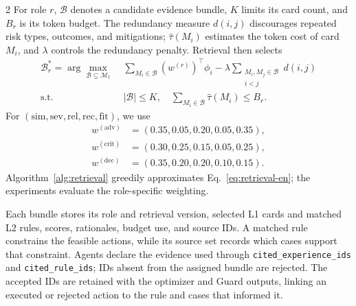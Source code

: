 \documentclass[10pt]{article}
\newcommand{\code}[1]{\texttt{#1}}
\begin{document}
\begin{multicols}{2}
For role $r$, $\mathcal{B}$ denotes a candidate evidence bundle, $K$ limits its card count, and $B_r$ is its token budget. The redundancy measure $d(i,j)$ discourages repeated risk types, outcomes, and mitigations; $\widehat{\tau}(M_i)$ estimates the token cost of card $M_i$, and $\lambda$ controls the redundancy penalty. Retrieval then selects
\begin{equation}
\begin{aligned}
\mathcal{B}_r^*=\arg\max_{\mathcal{B}\subseteq\mathcal{M}_t}\;&
\sum_{M_i\in\mathcal{B}}(w^{(r)})^\top\phi_i
-\lambda\!\sum_{\substack{M_i,M_j\in\mathcal{B}\\i<j}}d(i,j)\\
\text{s.t. }\;&|\mathcal{B}|\leq K,\quad
\sum_{M_i\in\mathcal{B}}\widehat{\tau}(M_i)\leq B_r .
\end{aligned}
\label{eq:retrieval-en}
\end{equation}
For $(\mathrm{sim},\mathrm{sev},\mathrm{rel},\mathrm{rec},\mathrm{fit})$, we use
\[
\begin{aligned}
w^{(\mathrm{adv})}&=(0.35,0.05,0.20,0.05,0.35),\\
w^{(\mathrm{crit})}&=(0.30,0.25,0.15,0.05,0.25),\\
w^{(\mathrm{dec})}&=(0.35,0.20,0.20,0.10,0.15).
\end{aligned}
\]
Algorithm~\ref{alg:retrieval} greedily approximates Eq.~\eqref{eq:retrieval-en}; the experiments evaluate the role-specific weighting.

Each bundle stores its role and retrieval version, selected L1 cards and matched L2 rules, scores, rationales, budget use, and source IDs. A matched rule constrains the feasible actions, while its source set records which cases support that constraint. Agents declare the evidence used through \code{cited\_experience\_ids} and \code{cited\_rule\_ids}; IDs absent from the assigned bundle are rejected. The accepted IDs are retained with the optimizer and Guard outputs, linking an executed or rejected action to the rule and cases that informed it.


\end{multicols}
\end{document}
